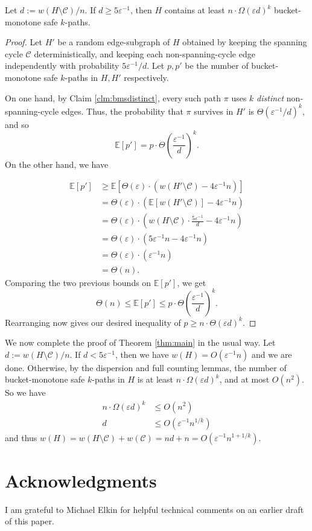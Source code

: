 \documentclass{theoretics}
\newcommand{\eps}{\varepsilon}
\newcommand{\cee}{\mathcal{C}}
\begin{document}
\begin{lemma} 
Let $d := w(H \setminus \cee) / n$.
If $d \ge 5 \eps^{-1}$, then $H$ contains at least $n \cdot \Omega(\eps d)^{k}$ bucket-monotone safe $k$-paths.
\end{lemma}
\begin{proof}
Let $H'$ be a random edge-subgraph of $H$ obtained by keeping the spanning cycle $\cee$ deterministically, and keeping each non-spanning-cycle edge independently with probability $5\eps^{-1} / d$.
Let $p, p'$ be the number of bucket-monotone safe $k$-paths in $H, H'$ respectively.

On one hand, by Claim \ref{clm:bmsdistinct}, every such path $\pi$ uses $k$ \emph{distinct} non-spanning-cycle edges.
Thus, the probability that $\pi$ survives in $H'$ is $\Theta(\eps^{-1} / d)^{k}$, and so
$$\mathbb{E}[p'] = p \cdot \Theta\left( \frac{\eps^{-1}}{d} \right)^{k}.$$
On the other hand, we have

\begin{align*}
\mathbb{E}[p'] &\ge \mathbb{E}\left[\Theta(\eps) \cdot \left( w(H' \setminus \cee) - 4\eps^{-1} n \right)\right] \tag*{Medium Counting Lemma}\\
&= \Theta(\eps) \cdot \left(\mathbb{E}\left[ w(H' \setminus \cee)\right] - 4\eps^{-1} n\right)\\
&= \Theta(\eps) \cdot \left( w(H \setminus \cee) \cdot \frac{5 \eps^{-1}}{d} - 4\eps^{-1}n\right)\\
&= \Theta(\eps) \cdot \left( 5 \eps^{-1} n - 4\eps^{-1} n\right)\\
&= \Theta(\eps) \cdot \left( \eps^{-1} n\right)\\
&= \Theta(n).
\end{align*}
Comparing the two previous bounds on $\mathbb{E}[p']$, we get
$$\Theta(n) \le \mathbb{E}[p'] \le p \cdot \Theta\left(\frac{\eps^{-1}}{d}\right)^{k}.$$
Rearranging now gives our desired inequality of
$p \ge n \cdot \Theta\left( \eps d \right)^k$.
\end{proof}

We now complete the proof of Theorem \ref{thm:main} in the usual way.
Let $d := w(H \setminus \cee)/n$.
If $d < 5 \eps^{-1}$, then we have $w(H) = O(\eps^{-1} n)$ and we are done.
Otherwise, by the dispersion and full counting lemmas, the number of bucket-monotone safe $k$-paths in $H$ is at least $n \cdot \Omega(\eps d)^k$, and at most $O(n^2)$.
So we have
\begin{align*}
n \cdot \Omega(\eps d)^k &\le O(n^2)\\
d &\le O\left(\eps^{-1} n^{1/k}\right)
\end{align*}
and thus $w(H) = w(H \setminus \cee) + w(\cee) = nd + n = O\left(\eps^{-1} n^{1+1/k}\right)$.

\section*{Acknowledgments}

I am grateful to Michael Elkin for helpful technical comments on an earlier draft of this paper.



\printbibliography
\end{document}
